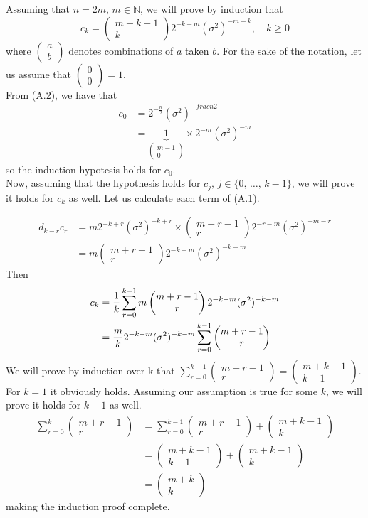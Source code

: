 \documentclass[12pt]{report}
\newcommand{\mb}[1]{\mathbb{#1}}
\newcommand{\sumlim}[3]{\sum\limits_{#1 = #2}^{#3}}
\newcommand{\ub}{\underbrace}
\newcommand{\comb}[2]{\begin{pmatrix}#1 \\ #2\end{pmatrix}}
\begin{document}
Assuming that $n = 2m,\,m\in\mb{N}$, we will prove by induction that
\begin{equation*}
    c_k = \comb{m + k - 1}{k}2^{-k-m}(\sigma^2)^{-m - k},\quad k \geq 0
\end{equation*}
where $\comb{a}{b}$ denotes combinations of $a$ taken $b$. For the sake of the notation, let us assume that $\comb{0}{0} = 1$. \\

From (A.2), we have that
\begin{align*}
    c_0 &= 2^{-\frac{n}{2}}(\sigma^2)^{-frac{n}{2}} \\
    &= \ub{1}_{\comb{m-1}{0}} \times 2^{-m}(\sigma^2)^{-m}
\end{align*}
so the induction hypotesis holds for $c_0$. \\

Now, assuming that the hypothesis holds for $c_j,\,j\in\{0,\,\dots,\,k-1\}$, we will prove it holds for $c_k$ as well. Let us calculate each term of (A.1).

\begin{align*}
    d_{k-r}c_r &= m2^{-k+r}(\sigma^2)^{-k+r} \times \comb{m+r-1}{r}2^{-r-m}(\sigma^2)^{-m-r} \\
    &= m\comb{m+r-1}{r} 2^{-k-m}(\sigma^2)^{-k-m} 
\end{align*}
Then
\begin{align}
    c_k &= \frac{1}{k}\sumlim{r}{0}{k-1}m\comb{m+r-1}{r} 2^{-k-m}(\sigma^2)^{-k-m} \notag\\
    &= \frac{m}{k}2^{-k-m}(\sigma^2)^{-k-m}\sumlim{r}{0}{k-1}\comb{m+r-1}{r}  \\
\end{align}
We will prove by induction over k that $\sumlim{r}{0}{k-1}\comb{m+r-1}{r} = \comb{m+k-1}{k-1}$. For $k = 1$ it obviously holds. Assuming our assumption is true for some $k$, we will prove it holds for $k+1$ as well.
\begin{align*}
    \sumlim{r}{0}{k}\comb{m+r-1}{r} &= \sumlim{r}{0}{k-1}\comb{m+r-1}{r} + \comb{m+k-1}{k} \\
    &= \comb{m+k-1}{k-1} + \comb{m+k-1}{k} \\
    &= \comb{m+k}{k}
\end{align*}
making the induction proof complete.
\end{document}
